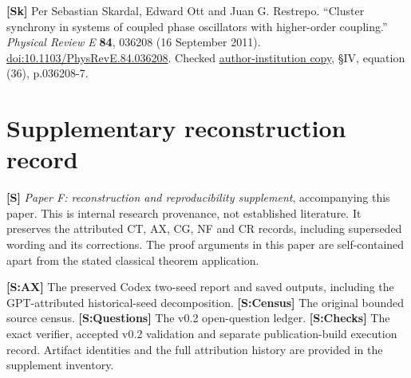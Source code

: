 \documentclass[
  11pt,
  a4paper,
]{article}
\begin{document}
\textbf{{[}Sk{]}} Per Sebastian Skardal, Edward Ott and Juan G. Restrepo. ``Cluster synchrony in systems of coupled phase oscillators with higher-order coupling.'' \emph{Physical Review E} \textbf{84}, 036208 (16 September 2011). \href{https://doi.org/10.1103/PhysRevE.84.036208}{doi:10.1103/PhysRevE.84.036208}. Checked \href{https://www.colorado.edu/amath/sites/default/files/attached-files/physreve_84_036208.pdf}{author-institution copy}, §IV, equation (36), p.036208-7.

\section{Supplementary reconstruction record}\label{supplementary-reconstruction-record}

\textbf{{[}S{]}} \emph{Paper F: reconstruction and reproducibility supplement}, accompanying this paper. This is internal research provenance, not established literature. It preserves the attributed CT, AX, CG, NF and CR records, including superseded wording and its corrections. The proof arguments in this paper are self-contained apart from the stated classical theorem application.

\textbf{{[}S:AX{]}} The preserved Codex two-seed report and saved outputs, including the GPT-attributed historical-seed decomposition. \textbf{{[}S:Census{]}} The original bounded source census. \textbf{{[}S:Questions{]}} The v0.2 open-question ledger. \textbf{{[}S:Checks{]}} The exact verifier, accepted v0.2 validation and separate publication-build execution record. Artifact identities and the full attribution history are provided in the supplement inventory.
\end{document}
